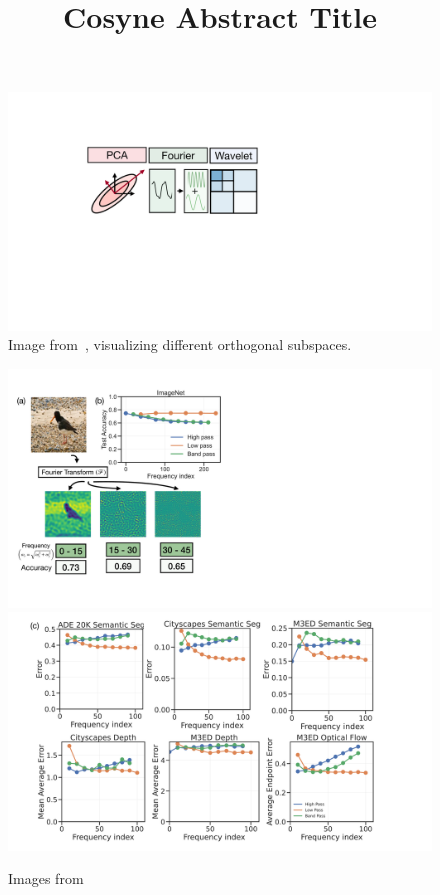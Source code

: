 \documentclass[12pt, letterpaper]{article}
\title{\color{custom}\large{\vspace{-1.5cm}%
    Cosyne Abstract Title}}
\date{}
\author{}
\begin{document}
\maketitle
\vspace*{-2cm}

\lipsum[0-3]

\vspace*{-0.2cm}
\hrulefill

\begin{figure}
    \vspace{-1.0em}
    \centering
    \includegraphics[width=\linewidth]{imgs/linear_cartoon.pdf}
    \caption{Image from~\citet{ramesh2024many}, visualizing different orthogonal subspaces.}
\end{figure}
\lipsum[4]

\lipsum[5]

\begin{figure}[!bh]
    \vspace*{-1em}
    \centering
    \includegraphics[width=0.39\linewidth]{imgs/panel1.pdf}
    \includegraphics[width=0.55\linewidth]{imgs/panel2.pdf}
    \caption{Images from~\citet{ramesh2024many}}
\end{figure}
\lipsum[5-13]

{}

\end{document}
